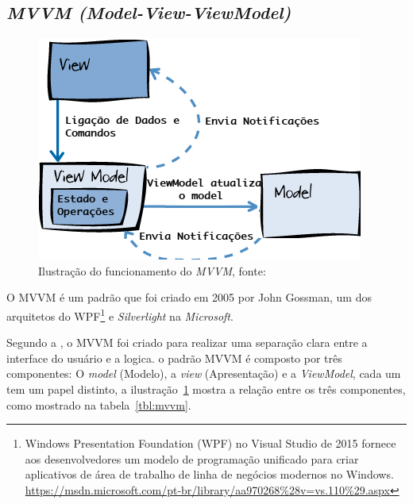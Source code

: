 \subsection{\textit{MVVM (Model-View-ViewModel)}}
\label{sec:mvvm}

    \begin{figure}[h]
        \centering
        \includegraphics[keepaspectratio=true,scale=0.8]{figuras/mvvm-microsoft-traduzido.png}
        \caption{Ilustração do funcionamento do \textit{MVVM}, fonte: \cite[tradução nossa]{ms_mvvm}}
        \label{fig:mvvm-microsoft}
    \end{figure}

O \ac{MVVM} é um padrão que foi criado em 2005 por John Gossman, um dos arquitetos do \ac{WPF}\footnote{Windows Presentation Foundation (WPF) no Visual Studio de 2015 fornece aos desenvolvedores um modelo de programação unificado para criar aplicativos de área de trabalho de linha de negócios modernos no Windows. \url{https://msdn.microsoft.com/pt-br/library/aa970268\%28v=vs.110\%29.aspx}} e \textit{Silverlight} na \textit{Microsoft}.

Segundo a , o \acf{MVVM} foi criado para realizar uma separação clara entre a interface do usuário e a logica. o padrão \ac{MVVM} é composto por três componentes: O \textit{model} (Modelo), a \textit{view} (Apresentação) e a \textit{ViewModel}, cada um tem um papel distinto, a ilustração~\ref{fig:mvvm-microsoft} mostra a relação entre os três componentes, como mostrado na tabela~\ref{tbl:mvvm}.

